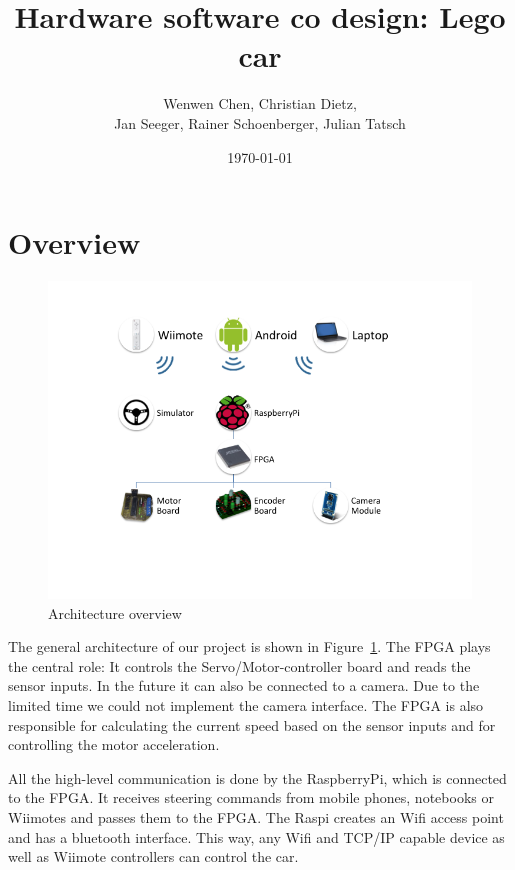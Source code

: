 \documentclass[a4paper
               ,10pt
               ,DIV=10 %
               ,BCOR=0.3cm
               ,pagesize %
               ,headings=small
               ,bibtotoc
               ]
               {scrartcl}
\title{Hardware software co design: Lego car}
\author{Wenwen Chen, Christian Dietz, \\
	Jan Seeger, Rainer Schoenberger, Julian Tatsch
}
\date{\today}
\begin{document}
\maketitle

\tableofcontents
\newpage
\section{Overview}

\begin{figure}[H]
\begin{center}
\includegraphics[width=\linewidth]{pic/architecture}
\caption{Architecture overview}
\label{figarchitecture}
\end{center}
\end{figure}

The general architecture of our project is shown in Figure~\ref{figarchitecture}.
The FPGA plays the central role:
It controls the Servo/Motor-controller board and reads the sensor inputs.
In the future it can also be connected to a camera.
Due to the limited time we could not implement the camera interface.
The FPGA is also responsible for calculating the current speed based on the sensor inputs and for controlling the motor acceleration.

All the high-level communication is done by the RaspberryPi, which is connected to the FPGA.
It receives steering commands from mobile phones, notebooks or Wiimotes and passes them to the FPGA.
The Raspi creates an Wifi access point and has a bluetooth interface.
This way, any Wifi and TCP/IP capable device as well as Wiimote controllers can control the car.
\end{document}
